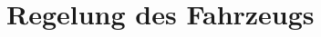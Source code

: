

\pagestyle{fancy}
\rhead{\thepage} \chead{} 
\cfoot{}

\section{Regelung des Fahrzeugs}\label{Sec9}


\newpage